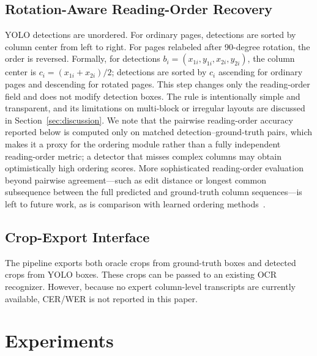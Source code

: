 \documentclass[pdflatex,sn-mathphys-num]{sn-jnl}
\begin{document}
\subsection{Rotation-Aware Reading-Order Recovery}
YOLO detections are unordered. For ordinary pages, detections are sorted by column center from left to right. For pages relabeled after 90-degree rotation, the order is reversed. Formally, for detections $b_i=(x_{1i},y_{1i},x_{2i},y_{2i})$, the column center is $c_i=(x_{1i}+x_{2i})/2$; detections are sorted by $c_i$ ascending for ordinary pages and descending for rotated pages. This step changes only the reading-order field and does not modify detection boxes. The rule is intentionally simple and transparent, and its limitations on multi-block or irregular layouts are discussed in Section~\ref{sec:discussion}. We note that the pairwise reading-order accuracy reported below is computed only on matched detection--ground-truth pairs, which makes it a proxy for the ordering module rather than a fully independent reading-order metric; a detector that misses complex columns may obtain optimistically high ordering scores. More sophisticated reading-order evaluation beyond pairwise agreement---such as edit distance or longest common subsequence between the full predicted and ground-truth column sequences---is left to future work, as is comparison with learned ordering methods~\cite{quiros2022reading}.

\subsection{Crop-Export Interface}
The pipeline exports both oracle crops from ground-truth boxes and detected crops from YOLO boxes. These crops can be passed to an existing OCR recognizer. However, because no expert column-level transcripts are currently available, CER/WER is not reported in this paper.

\section{Experiments}
\end{document}
